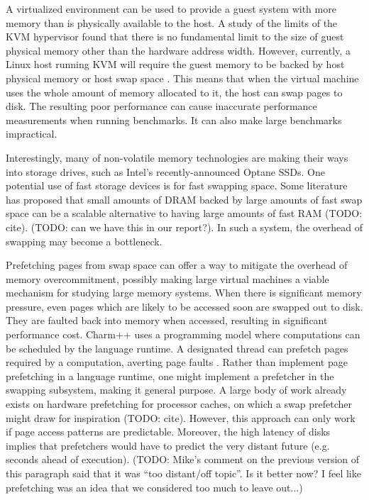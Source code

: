 \documentclass[twocolumn,11pt]{article}
\begin{document}
A virtualized environment can be used to provide a guest system with more memory
than is physically available to the host. A study of the limits of the KVM
hypervisor found that there is no fundamental limit to the size of guest
physical memory other than the hardware address width. However, currently, a
Linux host running KVM will require the guest memory to be backed by host
physical memory or host swap space \cite{ibmkvm}.  This means that when the
virtual machine uses the whole amount of memory allocated to it, the host can
swap pages to disk. The resulting poor performance can cause inaccurate
performance measurements when running benchmarks. It can also make large
benchmarks impractical.

Interestingly, many of non-volatile memory technologies are making their ways
into storage drives, such as Intel's recently-announced Optane SSDs. One
potential use of fast storage devices is for fast swapping space. Some
literature has proposed that small amounts of DRAM backed by large amounts of
fast swap space can be a scalable alternative to having large amounts of fast
RAM (TODO: cite). (TODO: can we have this in our report?). In such a system,
the overhead of swapping may become a bottleneck.

Prefetching pages from swap space can offer a way to mitigate the overhead of
memory overcommitment, possibly making large virtual machines a viable
mechanism for studying large memory systems. When there is significant memory
pressure, even pages which are likely to be accessed soon are swapped out to
disk. They are faulted back into memory when accessed, resulting in significant
performance cost.  Charm++ uses a programming model where computations can be
scheduled by the language runtime. A designated thread can prefetch pages
required by a computation, averting page faults \cite{charmpp}. Rather than
implement page prefetching in a language runtime, one might implement a
prefetcher in the swapping subsystem, making it general purpose. A large body
of work already exists on hardware prefetching for processor caches, on which a
swap prefetcher might draw for inspiration (TODO: cite). However, this approach
can only work if page access patterns are predictable. Moreover, the high
latency of disks implies that prefetchers would have to predict the very
distant future (e.g. seconds ahead of execution). (TODO: Mike's comment on the
previous version of this paragraph said that it was ``too distant/off topic''.
Is it better now? I feel like prefetching was an idea that we considered too
much to leave out...)
\end{document}
